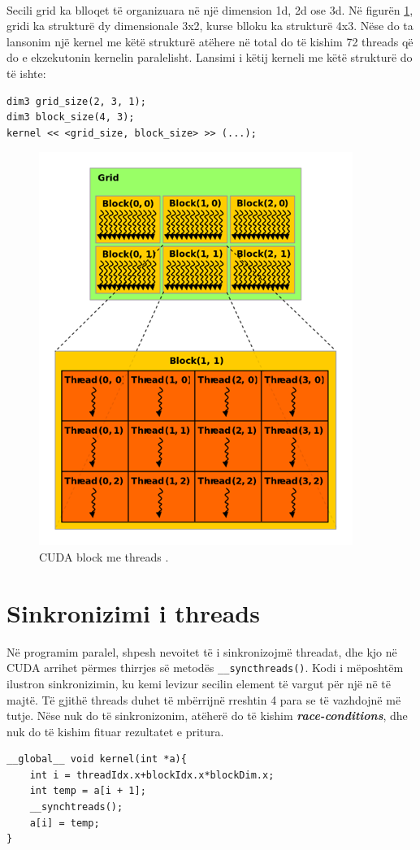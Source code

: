 \noindent \\ Secili grid ka blloqet të organizuara në një dimension 1d, 2d ose 3d. Në figurën \ref{fig:cuda_block_1}, gridi ka strukturë dy dimensionale 3x2, kurse blloku ka strukturë 4x3. Nëse do ta lansonim një kernel me këtë strukturë atëhere në total do të kishim 72 threads që do e ekzekutonin kernelin paralelisht.  Lansimi i këtij kerneli me këtë strukturë do të ishte:\\

\begin{lstlisting}
dim3 grid_size(2, 3, 1);
dim3 block_size(4, 3);
kernel << <grid_size, block_size> >> (...);
\end{lstlisting}

\begin{figure}[!]
    \centering
    \includegraphics[width=0.45\linewidth]{cuda_1.png}
    \caption{CUDA block me threads \cite{cuda_guide}.}
    \label{fig:cuda_block_1}
\end{figure}


\section{Sinkronizimi i threads}

\noindent Në programim paralel, shpesh nevoitet të i sinkronizojmë threadat, dhe kjo në CUDA arrihet përmes thirrjes së metodës \texttt{\_\_syncthreads()}. Kodi i mëposhtëm ilustron sinkronizimin, ku kemi levizur secilin element të vargut për një në të majtë. Të gjithë threads duhet të mbërrijnë rreshtin 4 para se të vazhdojnë më tutje. Nëse nuk do të sinkronizonim, atëherë do të kishim \textbf{\textit{race-conditions}}, dhe nuk do të kishim fituar rezultatet e pritura. \\


\begin{lstlisting}
__global__ void kernel(int *a){
    int i = threadIdx.x+blockIdx.x*blockDim.x;
    int temp = a[i + 1];
    __synchtreads();
    a[i] = temp;
}
\end{lstlisting}

